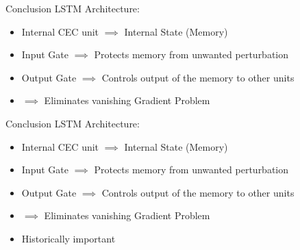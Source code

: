 \documentclass[10pt, aspectratio=169]{beamer}
\begin{document}
\begin{frame}[t]{Conclusion}
LSTM Architecture:
\begin{itemize}
    \item Internal CEC unit \begin{math}\implies \end{math} Internal State (Memory)
    \item Input Gate \begin{math}\implies\end{math} Protects memory from unwanted perturbation
    \item Output Gate \begin{math}\implies\end{math} Controls output of the memory to other units
    \item \begin{math}\implies\end{math} Eliminates vanishing Gradient Problem
\end{itemize}
\end{frame}

\begin{frame}[t]{Conclusion}
LSTM Architecture:
\begin{itemize}
    \item Internal CEC unit \begin{math}\implies \end{math} Internal State (Memory)
    \item Input Gate \begin{math}\implies\end{math} Protects memory from unwanted perturbation
    \item Output Gate \begin{math}\implies\end{math} Controls output of the memory to other units
    \item \begin{math}\implies\end{math} Eliminates vanishing Gradient Problem
    \item Historically important 
\end{itemize}
\end{frame}
\end{document}
